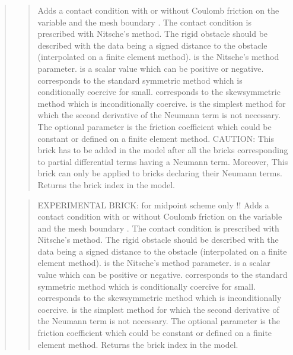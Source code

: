 \documentclass[a4paper,11pt,english]{sphinxmanual}
\begin{document}
\begin{quote}
\begin{quote}
\sphinxAtStartPar
Adds a contact condition with or without Coulomb friction on the variable
 and the mesh boundary . The contact condition
is prescribed with Nitsche’s method. The rigid obstacle should
be described with the data  being a signed distance to
the obstacle (interpolated on a finite element method).
 is the Nitsche’s method parameter.
 is a scalar value which can be
positive or negative.  corresponds to the standard symmetric
method which is conditionally coercive for   small.
 corresponds to the skew\sphinxhyphen{}symmetric method which is
inconditionally coercive.  is the simplest method
for which the second derivative of the Neumann term is not necessary.
The optional parameter  is the friction
coefficient which could be constant or defined on a finite element
method.
CAUTION: This brick has to be added in the model after all the bricks
corresponding to partial differential terms having a Neumann term.
Moreover, This brick can only be applied to bricks declaring their
Neumann terms. Returns the brick index in the model.
\end{quote}

\sphinxAtStartPar
{}
\begin{quote}

\sphinxAtStartPar
EXPERIMENTAL BRICK: for midpoint scheme only !!
Adds a contact condition with or without Coulomb friction on the variable
 and the mesh boundary . The contact condition
is prescribed with Nitsche’s method. The rigid obstacle should
be described with the data  being a signed distance to
the obstacle (interpolated on a finite element method).
 is the Nitsche’s method parameter.
 is a scalar value which can be
positive or negative.  corresponds to the standard symmetric
method which is conditionally coercive for   small.
 corresponds to the skew\sphinxhyphen{}symmetric method which is
inconditionally coercive.  is the simplest method
for which the second derivative of the Neumann term is not necessary.
The optional parameter  is the friction
coefficient which could be constant or defined on a finite element
method.
Returns the brick index in the model.
\end{quote}


\end{quote}
\end{document}
